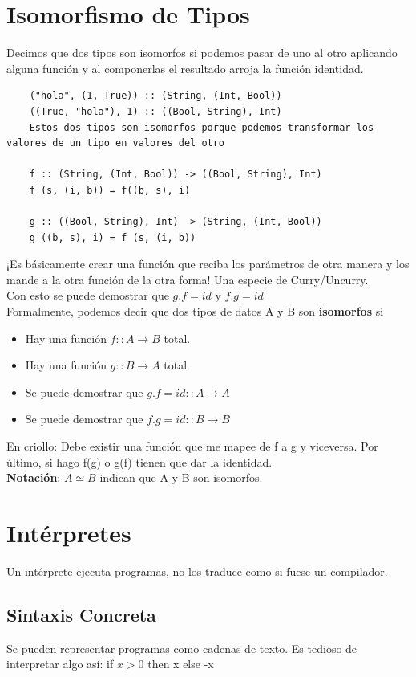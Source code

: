 \documentclass[10pt,a4paper]{article}
\begin{document}
\section*{Isomorfismo de Tipos}
Decimos que dos tipos son isomorfos si podemos pasar de uno al otro aplicando alguna función y al componerlas el resultado arroja la función identidad. 
\begin{lstlisting}
    ("hola", (1, True)) :: (String, (Int, Bool))
    ((True, "hola"), 1) :: ((Bool, String), Int)
    Estos dos tipos son isomorfos porque podemos transformar los valores de un tipo en valores del otro

    f :: (String, (Int, Bool)) -> ((Bool, String), Int)
    f (s, (i, b)) = f((b, s), i)

    g :: ((Bool, String), Int) -> (String, (Int, Bool))
    g ((b, s), i) = f (s, (i, b))

\end{lstlisting}
¡Es básicamente crear una función que reciba los parámetros de otra manera y los mande a la otra función de la otra forma! Una especie de Curry/Uncurry. \\
Con esto se puede demostrar que $g . f = id$ y $f . g = id$ \\
Formalmente, podemos decir que dos tipos de datos A y B son \textbf{isomorfos} si 
\begin{itemize}
    \item Hay una función $f :: A \rightarrow B$ total.
    \item Hay una función $g :: B \rightarrow A$ total 
    \item Se puede demostrar que $g . f = id :: A \rightarrow A$
    \item Se puede demostrar que $f . g = id :: B \rightarrow B$
\end{itemize}
En criollo: Debe existir una función que me mapee de f a g y viceversa. Por último, si hago f(g) o g(f) tienen que dar la identidad. \\
\textbf{Notación}: $A \simeq B$ indican que A y B son isomorfos.
\section*{Intérpretes}
Un intérprete ejecuta programas, no los traduce como si fuese un compilador. 
\subsection*{Sintaxis Concreta}
Se pueden representar programas como cadenas de texto. Es tedioso de interpretar algo así: if $x>0$ then x else -x 
\end{document}
